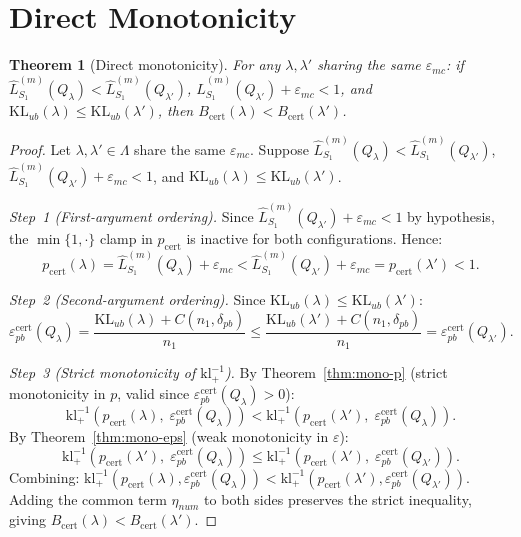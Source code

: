 \documentclass[11pt,a4paper]{article}
\newtheorem{theorem}{Theorem}
\newcommand{\kl}{\mathrm{kl}}
\newcommand{\KL}{\mathrm{KL}}
\newcommand{\klinv}{\kl^{-1}_+}
\begin{document}
\section{Direct Monotonicity}

\begin{theorem}[Direct monotonicity]
\label{thm:monotonicity}
For any $\lambda, \lambda'$ sharing the same $\varepsilon_{mc}$: if $\hat{L}_{S_1}^{(m)}(Q_\lambda) < \hat{L}_{S_1}^{(m)}(Q_{\lambda'})$, $\hat{L}_{S_1}^{(m)}(Q_{\lambda'}) + \varepsilon_{mc} < 1$, and $\KL_{ub}(\lambda) \le \KL_{ub}(\lambda')$, then $B_{\mathrm{cert}}(\lambda) < B_{\mathrm{cert}}(\lambda')$.
\end{theorem}

\begin{proof}
Let $\lambda, \lambda' \in \Lambda$ share the same $\varepsilon_{mc}$. Suppose $\hat{L}_{S_1}^{(m)}(Q_\lambda) < \hat{L}_{S_1}^{(m)}(Q_{\lambda'})$, $\hat{L}_{S_1}^{(m)}(Q_{\lambda'}) + \varepsilon_{mc} < 1$, and $\KL_{ub}(\lambda) \le \KL_{ub}(\lambda')$.

\emph{Step~1 (First-argument ordering).} Since $\hat{L}_{S_1}^{(m)}(Q_{\lambda'}) + \varepsilon_{mc} < 1$ by hypothesis, the $\min\{1,\cdot\}$ clamp in $p_{\mathrm{cert}}$ is inactive for both configurations. Hence:
\[
p_{\mathrm{cert}}(\lambda) = \hat{L}_{S_1}^{(m)}(Q_\lambda) + \varepsilon_{mc} < \hat{L}_{S_1}^{(m)}(Q_{\lambda'}) + \varepsilon_{mc} = p_{\mathrm{cert}}(\lambda') < 1.
\]

\emph{Step~2 (Second-argument ordering).} Since $\KL_{ub}(\lambda) \le \KL_{ub}(\lambda')$:
\[
\varepsilon_{pb}^{\mathrm{cert}}(Q_\lambda) = \frac{\KL_{ub}(\lambda) + C(n_1, \delta_{pb})}{n_1} \le \frac{\KL_{ub}(\lambda') + C(n_1, \delta_{pb})}{n_1} = \varepsilon_{pb}^{\mathrm{cert}}(Q_{\lambda'}).
\]

\emph{Step~3 (Strict monotonicity of $\klinv$).} By Theorem~\ref{thm:mono-p} (strict monotonicity in $p$, valid since $\varepsilon_{pb}^{\mathrm{cert}}(Q_\lambda) > 0$):
\[
\klinv(p_{\mathrm{cert}}(\lambda),\; \varepsilon_{pb}^{\mathrm{cert}}(Q_\lambda)) < \klinv(p_{\mathrm{cert}}(\lambda'),\; \varepsilon_{pb}^{\mathrm{cert}}(Q_\lambda)).
\]
By Theorem~\ref{thm:mono-eps} (weak monotonicity in $\varepsilon$):
\[
\klinv(p_{\mathrm{cert}}(\lambda'),\; \varepsilon_{pb}^{\mathrm{cert}}(Q_\lambda)) \le \klinv(p_{\mathrm{cert}}(\lambda'),\; \varepsilon_{pb}^{\mathrm{cert}}(Q_{\lambda'})).
\]
Combining: $\klinv(p_{\mathrm{cert}}(\lambda), \varepsilon_{pb}^{\mathrm{cert}}(Q_\lambda)) < \klinv(p_{\mathrm{cert}}(\lambda'), \varepsilon_{pb}^{\mathrm{cert}}(Q_{\lambda'}))$. Adding the common term $\eta_{num}$ to both sides preserves the strict inequality, giving $B_{\mathrm{cert}}(\lambda) < B_{\mathrm{cert}}(\lambda')$.
\end{proof}
\end{document}
